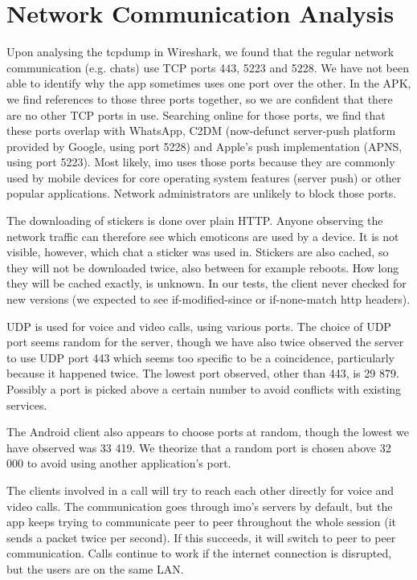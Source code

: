 \documentclass[conference]{IEEEtran}
\begin{document}
\section{Network Communication Analysis}\label{sec:network}

Upon analysing the tcpdump in Wireshark, we found that the regular network
communication (e.g. chats) use TCP ports 443, 5223 and 5228. We have not been
able to identify why the app sometimes uses one port over the other. In the APK,
we find references to those three ports together, so we are confident that there
are no other TCP ports in use.  Searching online for those ports, we find that
these ports overlap with WhatsApp, C2DM (now-defunct server-push platform
provided by Google, using port 5228) and Apple's push implementation (APNS,
using port 5223). Most likely, imo uses those ports because they are commonly
used by mobile devices for core operating system features (server push) or other
popular applications. Network administrators are unlikely to block those ports.

The downloading of stickers is done over plain HTTP. Anyone observing the
network traffic can therefore see which emoticons are used by a device. It is
not visible, however, which chat a sticker was used in. Stickers are also
cached, so they will not be downloaded twice, also between for example reboots.
How long they will be cached exactly, is unknown. In our tests, the client
never checked for new versions (we expected to see if-modified-since or
if-none-match http headers).

UDP is used for voice and video calls, using various ports. The choice of UDP
port seems random for the server, though we have also twice observed the server
to use UDP port 443 which seems too specific to be a coincidence, particularly
because it happened twice. The lowest port observed, other than 443, is 29 879.
Possibly a port is picked above a certain number to avoid conflicts with
existing services.

The Android client also appears to choose ports at random, though the lowest we
have observed was 33 419. We theorize that a random port is chosen above 32 000
to avoid using another application's port.

The clients involved in a call will try to reach each other directly for voice
and video calls. The communication goes through imo's servers by default, but
the app keeps trying to communicate peer to peer throughout the whole session
(it sends a packet twice per second). If this succeeds, it will switch to peer
to peer communication. Calls continue to work if the internet connection is
disrupted, but the users are on the same LAN.
\end{document}
